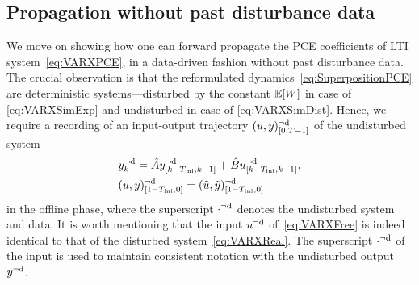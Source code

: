 \subsection{Propagation without past disturbance data}
We move on showing how one can forward propagate the PCE coefficients of LTI system~\eqref{eq:VARXPCE}, in a data-driven fashion without past disturbance data. The crucial observation is that the reformulated dynamics~\eqref{eq:SuperpositionPCE} are deterministic systems---disturbed by the constant $\mathbb{E}[W]$ in case of \eqref{eq:VARXSimExp} and undisturbed in case of \eqref{eq:VARXSimDist}.
Hence, we require a recording of an input-output trajectory $(u,y)_{[0,T-1]}^{\neg\mathrm{d}}$ of the undisturbed system
\begin{subequations} \label{eq:VARXFree}
	\begin{align}
		&y_k^{\neg\mathrm{d}} = \hat{A}y_{[k-T_\text{ini},k-1]}^{\neg\mathrm{d}} + \hat{B}u_{[k-T_\text{ini},k-1]}^{\neg\mathrm{d}}, \label{eq:VARXDyn}\\
		&(u,y)_{[1-T_\text{ini},0]}^{\neg\mathrm{d}} = (\tilde{u},\tilde{y})_{[1-T_\text{ini},0]}^{\neg\mathrm{d}} \label{eq:VARXFreeIni}
	\end{align}
\end{subequations}
in the offline phase, where the superscript $\cdot^{\neg\mathrm{d}}$ denotes the undisturbed system and data. It is worth mentioning that the input ${u}^{\neg\mathrm{d}}$ of~\eqref{eq:VARXFree} is indeed identical to that of the disturbed system~\eqref{eq:VARXReal}. The superscript $\cdot^{\neg\mathrm{d}}$ of the input is used to maintain consistent notation with the undisturbed output $y^{\neg\mathrm{d}}$.

